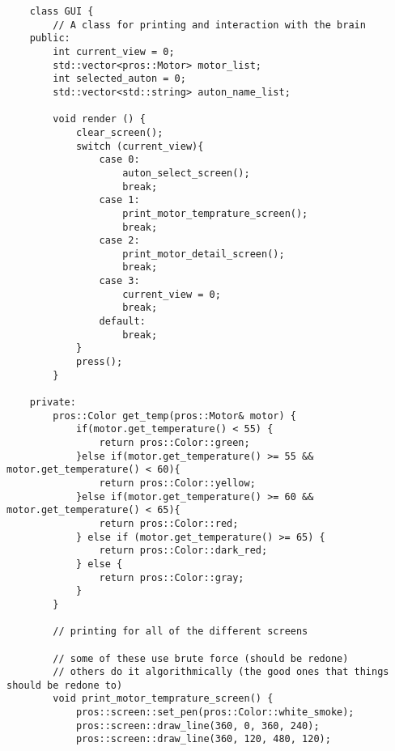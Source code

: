 \begin{verbatim}
    class GUI {
        // A class for printing and interaction with the brain
    public:
        int current_view = 0;
        std::vector<pros::Motor> motor_list;
        int selected_auton = 0;
        std::vector<std::string> auton_name_list;

        void render () {
            clear_screen();
            switch (current_view){
                case 0:
                    auton_select_screen();
                    break;
                case 1:
                    print_motor_temprature_screen();
                    break;
                case 2:
                    print_motor_detail_screen();
                    break;
                case 3:
                    current_view = 0;
                    break;
                default:
                    break;
            }
            press();
        }

    private:
        pros::Color get_temp(pros::Motor& motor) {
            if(motor.get_temperature() < 55) {
                return pros::Color::green;
            }else if(motor.get_temperature() >= 55 && motor.get_temperature() < 60){
                return pros::Color::yellow;
            }else if(motor.get_temperature() >= 60 && motor.get_temperature() < 65){
                return pros::Color::red;
            } else if (motor.get_temperature() >= 65) {
                return pros::Color::dark_red;
            } else {
                return pros::Color::gray;
            }
        }

        // printing for all of the different screens

        // some of these use brute force (should be redone)
        // others do it algorithmically (the good ones that things should be redone to)
        void print_motor_temprature_screen() {
            pros::screen::set_pen(pros::Color::white_smoke);
            pros::screen::draw_line(360, 0, 360, 240);
            pros::screen::draw_line(360, 120, 480, 120);


\end{verbatim}
